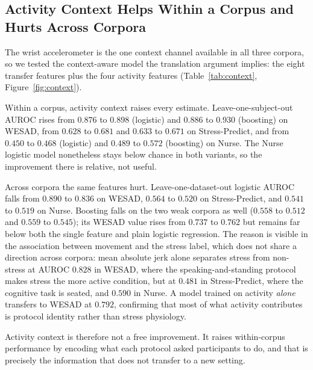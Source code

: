 \documentclass[healthcare,article,submit,moreauthors,pdftex]{Definitions/mdpi}
\begin{document}
\subsection{Activity Context Helps Within a Corpus and Hurts Across Corpora}
\label{sec:context}

The wrist accelerometer is the one context channel available in all three
corpora, so we tested the context-aware model the translation argument implies:
the eight transfer features plus the four activity features
(Table~\ref{tab:context}, Figure~\ref{fig:context}).

Within a corpus, activity context raises every estimate. Leave-one-subject-out
AUROC rises from $0.876$ to $0.898$ (logistic) and $0.886$ to $0.930$ (boosting)
on WESAD, from $0.628$ to $0.681$ and $0.633$ to $0.671$ on Stress-Predict, and
from $0.450$ to $0.468$ (logistic) and $0.489$ to $0.572$ (boosting) on Nurse.
The Nurse logistic model nonetheless stays below chance in both variants, so the
improvement there is relative, not useful.

Across corpora the same features hurt. Leave-one-dataset-out logistic AUROC falls
from $0.890$ to $0.836$ on WESAD, $0.564$ to $0.520$ on Stress-Predict, and
$0.541$ to $0.519$ on Nurse. Boosting falls on the two weak corpora as well
($0.558$ to $0.512$ and $0.559$ to $0.545$); its WESAD value rises from $0.737$
to $0.762$ but remains far below both the single feature and plain logistic
regression. The reason is visible in the association between
movement and the stress label, which does not share a direction across corpora:
mean absolute jerk alone separates stress from non-stress at AUROC $0.828$ in
WESAD, where the speaking-and-standing protocol makes stress the more active
condition, but at $0.481$ in Stress-Predict, where the cognitive task is seated,
and $0.590$ in Nurse. A model trained on activity \emph{alone} transfers to WESAD
at $0.792$, confirming that most of what activity contributes is protocol
identity rather than stress physiology.

Activity context is therefore not a free improvement. It raises within-corpus
performance by encoding what each protocol asked participants to do, and that is
precisely the information that does not transfer to a new setting.
\end{document}
